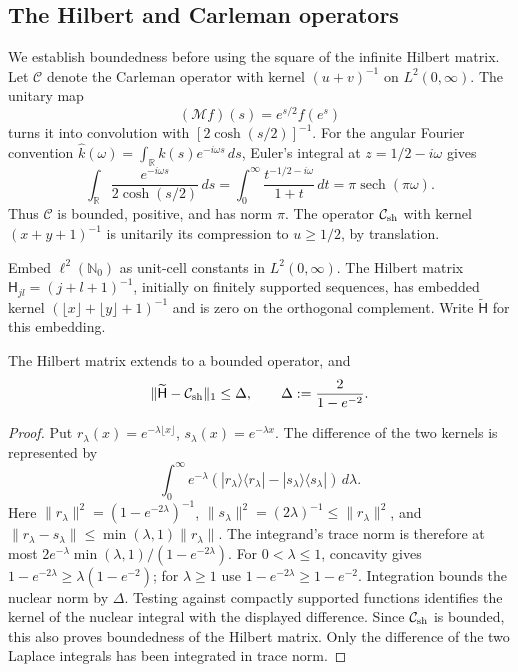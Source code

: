 \subsection{The Hilbert and Carleman operators}
\label{rev5:subsec:hilbert-carleman}

We establish boundedness before using the square of the infinite Hilbert
matrix.  Let $\mathcal C$ denote the Carleman operator with kernel
$(u+v)^{-1}$ on $L^2(0,\infty)$.  The unitary map
\[
 (\mathscr Mf)(s)=e^{s/2}f(e^s)
\]
turns it into convolution with $[2\cosh(s/2)]^{-1}$.  For the angular
Fourier convention $\widehat k(\omega)=\int_{\mathbb R}k(s)e^{-i\omega s}\,ds$,
Euler's integral at $z=1/2-i\omega$ gives
\begin{equation}\label{rev5:eq:carleman-multiplier}
 \int_{\mathbb R}\frac{e^{-i\omega s}}{2\cosh(s/2)}\,ds
 =\int_0^\infty\frac{t^{-1/2-i\omega}}{1+t}\,dt
 =\pi\operatorname{sech}(\pi\omega).
\end{equation}
Thus $\mathcal C$ is bounded, positive, and has norm $\pi$.
The operator $\mathcal C_{\rm sh}$ with kernel $(x+y+1)^{-1}$ is
unitarily its compression to $u\geq1/2$, by translation.

Embed $\ell^2(\mathbb N_0)$ as unit-cell constants in $L^2(0,\infty)$.
The Hilbert matrix $\mathsf H_{jl}=(j+l+1)^{-1}$, initially on finitely
supported sequences, has embedded kernel
$(\lfloor x\rfloor+\lfloor y\rfloor+1)^{-1}$ and is zero on the
orthogonal complement.  Write $\widetilde{\mathsf H}$ for this embedding.

\begin{lemma}\label{rev5:lem:hilbert-carleman}
The Hilbert matrix extends to a bounded operator, and
\begin{equation}\label{rev5:eq:hilbert-carleman}
 \|\widetilde{\mathsf H}-\mathcal C_{\rm sh}\|_1\leq\Delta,
 \qquad \Delta:=\frac{2}{1-e^{-2}}.
\end{equation}
\end{lemma}

\begin{proof}
Put $r_\lambda(x)=e^{-\lambda\lfloor x\rfloor}$,
$s_\lambda(x)=e^{-\lambda x}$.  The difference of the two kernels is
represented by
\[
 \int_0^\infty e^{-\lambda}
   (|r_\lambda\rangle\langle r_\lambda|
     -|s_\lambda\rangle\langle s_\lambda|)\,d\lambda.
\]
Here
$\|r_\lambda\|^2=(1-e^{-2\lambda})^{-1}$,
$\|s_\lambda\|^2=(2\lambda)^{-1}\leq\|r_\lambda\|^2$, and
$\|r_\lambda-s_\lambda\|\leq\min(\lambda,1)\|r_\lambda\|$.  The integrand's
trace norm is therefore at most
$2e^{-\lambda}\min(\lambda,1)/(1-e^{-2\lambda})$.  For $0<\lambda\leq1$,
concavity gives $1-e^{-2\lambda}\geq\lambda(1-e^{-2})$; for $\lambda\geq1$
use $1-e^{-2\lambda}\geq1-e^{-2}$.  Integration bounds the nuclear norm by
$\Delta$.  Testing against compactly supported functions identifies
the kernel of the nuclear integral with the displayed difference.
Since $\mathcal C_{\rm sh}$ is bounded, this also proves boundedness
of the Hilbert matrix.  Only the difference of the two Laplace
integrals has been integrated in trace norm.
\end{proof}

